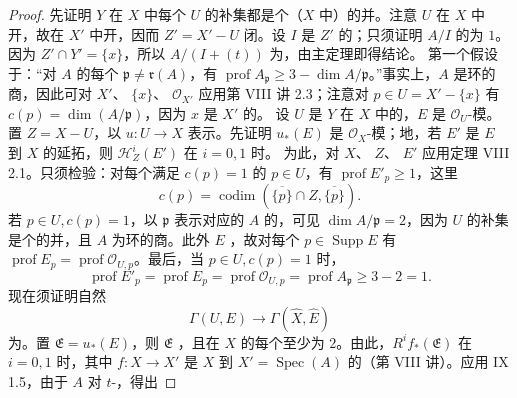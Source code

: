 \begin{proof}
先证明 $Y$ 在 $X$ 中每个 $U$ 的补集都是个（$X$ 中）的并。注意 $U$ 在 $X$ 中开，故在 $X'$ 中开，因而 $Z'=X'-U$ 闭。设 $I$ 是 $Z'$ 的；只须证明 $A/I$ 的为 $1$。因为 $Z'\cap Y'=\{x\}$，所以 $A/(I+(t))$ 为，由主定理即得结论。
第一个假设于：“对 $A$ 的每个 $\mathfrak p\ne\mathfrak r(A)$，有 $\operatorname{prof}A_{\mathfrak p}\geq3-\dim A/\mathfrak p$。”事实上，$A$ 是环的商，因此可对 $X'$、 $\{x\}$、 $\mathcal O_{X'}$ 应用第 VIII 讲 2.3；注意对 $p\in U=X'-\{x\}$ 有 $c(p)=\dim(A/\mathfrak p)$，因为 $x$ 是 $X'$ 的。
设 $U$ 是 $Y$ 在 $X$ 中的，$E$ 是 $\mathcal O_U$-模。置 $Z=X-U$，以 $u:U\to X$ 表示。先证明 $u_*(E)$ 是 $\mathcal O_X$-模；地，若 $E'$ 是 $E$ 到 $X$ 的延拓，则 $\mathcal H^i_Z(E')$ 在 $i=0,1$ 时。
为此，对 $X$、 $Z$、 $E'$ 应用定理 VIII 2.1。只须检验：对每个满足 $c(p)=1$ 的 $p\in U$，有 $\operatorname{prof}E'_p\geq1$，这里
\[c(p)=\operatorname{codim}(\overline{\{p\}}\cap Z,\overline{\{p\}}).\]
若 $p\in U,c(p)=1$，以 $\mathfrak p$ 表示对应的 $A$ 的，可见 $\dim A/\mathfrak p=2$，因为 $U$ 的补集是个的并，且 $A$ 为环的商。此外 $E$ ，故对每个 $p\in\operatorname{Supp}E$ 有 $\operatorname{prof}E_p=\operatorname{prof}\mathcal O_{U,p}$。最后，当 $p\in U,c(p)=1$ 时，
\[\operatorname{prof}E'_p=\operatorname{prof}E_p=\operatorname{prof}\mathcal O_{U,p}=\operatorname{prof}A_{\mathfrak p}\geq3-2=1.\]
现在须证明自然
\[\Gamma(U,E)\longrightarrow\Gamma(\widehat X,\widehat E)\tag{1}\]
为。置 $\mathfrak E=u_*(E)$，则 $\mathfrak E$ ，且在 $X$ 的每个至少为 $2$。由此，$R^if_*(\mathfrak E)$ 在 $i=0,1$ 时，其中 $f:X\to X'$ 是 $X$ 到 $X'=\operatorname{Spec}(A)$ 的（第 VIII 讲）。应用 IX 1.5，由于 $A$ 对 $t$-，得出

\end{proof}
